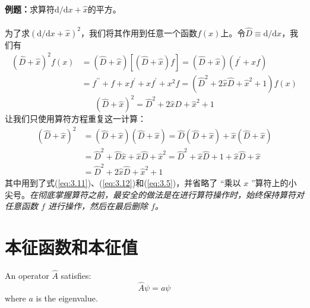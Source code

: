 	\begin{examplebox}
		\textbf{例题：}求算符$\mathrm{d}/\mathrm{d}x+\hat{x}$的平方。\\
		\\
		为了求$\left(\mathrm{d}/\mathrm{d}x+\hat{x}\right)^2$，我们将其作用到任意一个函数$f\left(x\right)$上。令$\hat{D} \equiv \mathrm{d}/\mathrm{d}x$，我们有
		\begin{equation*}
			\begin{aligned}
				\left(\hat{D}+\hat{x}\right)^2f\left(x\right) & = \left(\hat{D}+\hat{x}\right)\left[\left(\hat{D}+\hat{x}\right)f\right] = \left(\hat{D}+\hat{x}\right)\left(f^{\prime}+xf\right) \\
				& = f^{\prime \prime}+f+xf^{\prime}+xf^{\prime}+x^2f=\left(\hat{D}^2+2\hat{x}\hat{D}+\hat{x}^2+1\right)f\left(x\right)
			\end{aligned}
		\end{equation*}
		\begin{equation*}
			\left(\hat{D}+\hat{x}\right)^2 = \hat{D}^2+2\hat{x}\hat{D}+\hat{x}^2+1
		\end{equation*}
		让我们只使用算符方程重复这一计算：
		\begin{equation*}
			\begin{aligned}
				\left(\hat{D}+\hat{x}\right)^2 & = \left(\hat{D}+\hat{x}\right)\left(\hat{D}+\hat{x}\right) = \hat{D}\left(\hat{D}+\hat{x}\right)+\hat{x}\left(\hat{D}+\hat{x}\right) \\
				& = \hat{D}^2+\hat{D}\hat{x}+\hat{x}\hat{D}+\hat{x}^2 = \hat{D}^2+\hat{x}\hat{D}+1+\hat{x}\hat{D}+\hat{x} \\
				& = \hat{D}^2+2\hat{x}\hat{D}+\hat{x}^2+1
			\end{aligned}
		\end{equation*}
		其中用到了式(\ref{eq:3.11})、(\ref{eq:3.12})和(\ref{eq:3.5})，并省略了 “乘以 $x$ ”算符上的小尖号。\textit{在彻底掌握算符之前，最安全的做法是在进行算符操作时，始终保持算符对任意函数 $f$ 进行操作，然后在最后删除 $f$。}
		
		
		
	\end{examplebox}
	
\section{本征函数和本征值}
An operator $\hat{A}$ satisfies:
\begin{equation}
	\hat{A} \psi = a \psi
\end{equation}
where $a$ is the eigenvalue.

